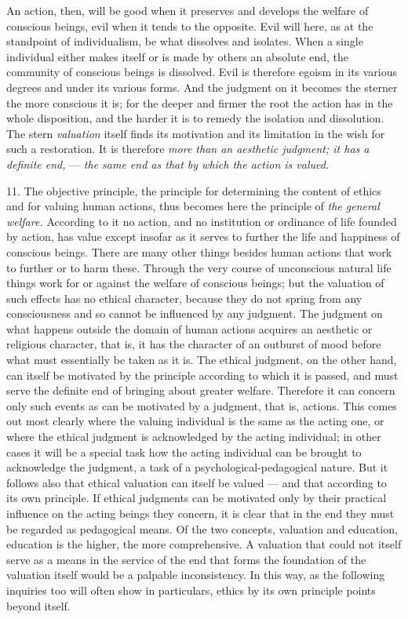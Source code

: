 \documentclass[12pt,a4paper,openany]{book}
\newcommand{\opage}[1]{\marginnote{\footnotesize\textit{[#1]}}}
\begin{document}
An action, then, will be good when it preserves and develops the welfare of conscious beings, evil
when it tends to the opposite. Evil will here, as at the standpoint of individualism, be what
dissolves and isolates. When a single individual either makes itself or is made by others an
absolute end, the community of conscious beings is dissolved. Evil is therefore egoism in its various
degrees and under its various forms. And the judgment on it becomes the sterner the more conscious it
is; for the deeper and firmer the root the action has in the whole disposition, and the harder it is
to remedy the isolation and dissolution. The stern \textit{valuation} itself finds its motivation and
its limitation in the wish for such a restoration. It is therefore \textit{more than an aesthetic
judgment; it has a definite end,} --- \textit{the same end as that by which the action is valued.}

11. The objective principle, the principle for determining the content of ethics and for valuing
human actions, thus becomes here the principle of \textit{the general welfare.} According to it no
action, and no institution or ordinance of life founded by action, has value except insofar as it
serves to further the life and happiness of conscious beings. There are many other things besides
human actions that work to further or to harm these. Through the very course of unconscious natural
life things work for or against the welfare of conscious beings; but the valuation of such effects
has no ethical character, because they do not spring from any consciousness and so cannot be
influenced by any judgment. The judgment on what happens outside the domain of human actions
acquires an aesthetic or religious character, that is, it has the character of an outburst of mood
before what must essentially be taken as it is. The ethical judgment, on the other hand, can itself
be motivated by the principle according to which it is passed, and must serve the definite
\opage{44}end of bringing about greater welfare. Therefore it can concern only such events as can be
motivated by a judgment, that is, actions. This comes out most clearly where the valuing individual
is the same as the acting one, or where the ethical judgment is acknowledged by the acting
individual; in other cases it will be a special task how the acting individual can be brought to
acknowledge the judgment, a task of a psychological-pedagogical nature. But it follows also that
ethical valuation can itself be valued --- and that according to its own principle. If ethical
judgments can be motivated only by their practical influence on the acting beings they concern, it
is clear that in the end they must be regarded as pedagogical means. Of the two concepts, valuation
and education, education is the higher, the more comprehensive. A valuation that could not itself
serve as a means in the service of the end that forms the foundation of the valuation itself would
be a palpable inconsistency. In this way, as the following inquiries too will often show in
particulars, ethics by its own principle points beyond itself.
\end{document}
